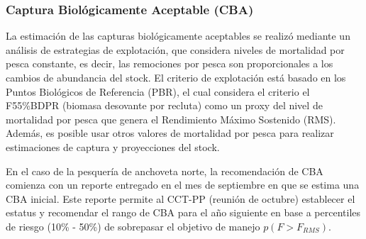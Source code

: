 \documentclass[letter,11pt]{article}
\begin{document}
\subsubsection{Captura Biol\'ogicamente Aceptable (CBA)}

La estimaci\'on de las capturas biol\'ogicamente aceptables se realiz\'o
mediante un an\'alisis de estrategias de explotaci\'on, que considera
niveles de mortalidad por pesca constante, es decir, las remociones por
pesca son proporcionales a los cambios de abundancia del stock. El
criterio de explotaci\'on est\'a basado en los Puntos Biol\'ogicos de
Referencia (PBR), el cual considera el criterio el F55\%BDPR (biomasa
desovante por recluta) como un proxy del nivel de mortalidad por pesca
que genera el Rendimiento M\'aximo Sostenido (RMS). Adem\'as, es posible
usar otros valores de mortalidad por pesca para realizar estimaciones de
captura y proyecciones del stock.

En el caso de la pesquer\'ia de anchoveta norte, la recomendaci\'on de CBA
comienza con un reporte entregado en el mes de septiembre en que se
estima una CBA inicial. Este reporte permite al CCT-PP (reuni\'on de
octubre) establecer el estatus y recomendar el rango de CBA para el a\~{n}o
siguiente en base a percentiles de riesgo (10\% - 50\%) de sobrepasar el
objetivo de manejo $p(F>F_{RMS})$.\\
\end{document}
